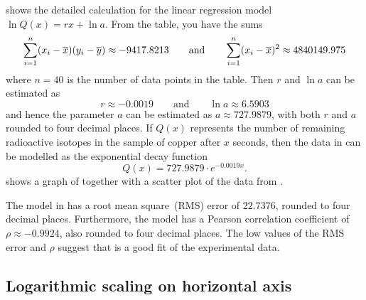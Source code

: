 \documentclass[a4paper,oneside,12pt]{article}
\begin{document}
{\begin{solution}
 shows the detailed
calculation for the linear regression model
$\ln Q(x) = rx + \ln a$.  From the table, you have the sums
\[
\sum_{i=1}^n (x_i - \overline{x}) (y_i - \overline{y})
\approx
-9417.8213
\qquad
\text{and}
\qquad
\sum_{i=1}^n (x_i - \overline{x})^2
\approx
4840149.975
\]
where $n = 40$ is the number of data points in the table.  Then $r$
and $\ln a$ can be estimated as
\[
r
\approx
-0.0019
\qquad
\text{and}
\qquad
\ln a
\approx
6.5903
\]
and hence the parameter $a$ can be estimated as
$a \approx 727.9879$, with both $r$ and $a$ rounded to four decimal
places.  If $Q(x)$ represents the number of remaining radioactive
isotopes in the sample of copper after $x$ seconds, then the data in
 can be modelled as the
exponential decay function
\begin{equation}
\label{eqn:logarithm:copper_decay_model}
Q(x)
=
727.9879 \cdot e^{-0.0019 x}.
\end{equation}
 shows a
graph of  together with a
scatter plot of the data from
.

The model in  has a root
mean square~(RMS) error of $22.7376$, rounded to four decimal places.
Furthermore, the model has a Pearson correlation coefficient of
$\rho \approx -0.9924$, also rounded to four decimal places.  The low
values of the RMS error and $\rho$ suggest that
 is a good fit of the
experimental data.
\end{solution}
}{}



\subsection{Logarithmic scaling on horizontal axis}
\label{subsec:logarithm:logarithmic_scaling_on_horizontal_axis}
\end{document}
